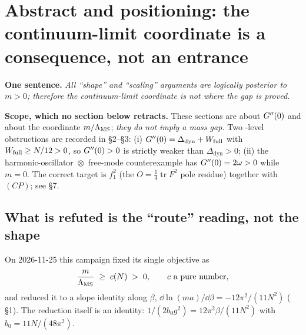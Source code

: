\section{Abstract and positioning: the continuum-limit coordinate is a consequence, not an entrance}
\label{sec:position}

\begin{keybox}
\textbf{One sentence.} \emph{All ``shape'' and ``scaling'' arguments are logically posterior to
$m>0$; therefore the continuum-limit coordinate is not where the gap is proved.} \LN
\end{keybox}

\begin{keybox}
\textbf{Scope, which no section below retracts.} These sections are about $G''(0)$ and about the coordinate
$m/\Lambda_{\mathrm{MS}}$; \emph{they do not imply a mass gap.} Two \LT{}-level obstructions are recorded in
 \S2--\S3: (i) $G''(0)=\Delta_{\mathrm{dyn}}+W_{\mathrm{full}}$ with $W_{\mathrm{full}}\ge N/12>0$, so $G''(0)>0$ is
strictly weaker than $\Delta_{\mathrm{dyn}}>0$; (ii) the harmonic-oscillator~$\otimes$~free-mode
counterexample has $G''(0)=2\omega>0$ while $m=0$. The correct target is $f_{1}^{2}$ (the
$O=\frac14\operatorname{tr}F^{2}$ pole residue) together with $(CP)$; see  \S7. \LN
\end{keybox}

\subsection{What is refuted is the ``route'' reading, not the shape}

On 2026-11-25 this campaign fixed its single objective as
\begin{equation}
  \frac{m}{\Lambda_{\mathrm{MS}}} \;\ge\; c(N)\;>\;0 ,
  \qquad c \ \text{a pure number},
  \label{eq:target}
\end{equation}
and reduced it to a slope identity along $\beta$,
$\dd\ln(ma)/\dd\beta = -12\pi^{2}/(11N^{2})$ ( \S1). The reduction itself is
an identity: $1/(2b_0g^{2}) = 12\pi^{2}\beta/(11N^{2})$ with $b_0=11N/(48\pi^{2})$. \LT
{}

